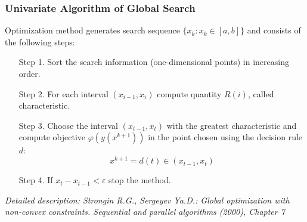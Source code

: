 \documentclass[aspectratio=1610]{beamer}
\begin{document}
\begin{frame}
  \frametitle{Univariate Algorithm of Global Search}
  Optimization method generates search sequence \(\{x_k:x_k\in[a,b]\}\) and consists of the following steps:
  \begin{enumerate}
    \setlength{\itemindent}{.1in}
    \item[Step 1.] Sort the search information (one-dimensional points) in increasing order.
    \item[Step 2.] For each interval \((x_{i-1}, x_i)\) compute quantity \(R(i)\), called characteristic.
    \item[Step 3.] Choose the interval \((x_{t-1}, x_{t})\) with the greatest characteristic and
    compute objective \(\varphi(y(x^{k+1}))\) in the point chosen using the decision rule \(d\):
    \begin{displaymath}
      x^{k+1}=d(t)\in (x_{t-1}, x_{t})
    \end{displaymath}
    \item[Step 4.] If \(x_{t}-x_{t-1}<\varepsilon\) stop the method.
  \end{enumerate}
  \textit{\footnotesize	{Detailed description: Strongin R.G., Sergeyev Ya.D.: Global optimization with non-convex constraints. Sequential and parallel algorithms (2000), Chapter 7}}
\end{frame}
\end{document}
